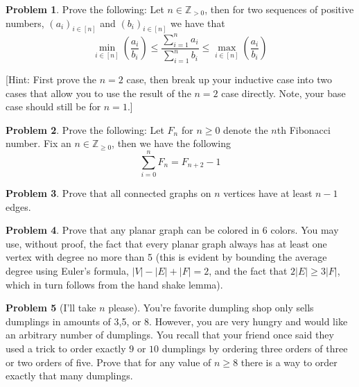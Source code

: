 \documentclass{article}
\theoremstyle{plain}
\theoremstyle{definition}
\newtheorem{problem}{Problem}[section]
\newcommand{\ZZ}{\mathbb{Z}_{\geq 0}}
\newcommand{\ZZZ}{\mathbb{Z}_{> 0}}
\begin{document}
\begin{problem}
    Prove the following:
    Let \(n \in \ZZZ\), then for two sequences of positive numbers, \((a_i)_{i \in [n]}\) and \((b_i)_{i \in [n]}\) we have that
    \[\min_{i \in [n]} \left(\frac{a_i}{b_i}\right) \leq \frac{\sum_{i = 1}^n a_i}{\sum_{i = 1}^n b_i} \leq \max_{i \in [n]} \left(\frac{a_i}{b_i}\right)\]

    [Hint: First prove the \(n=2\) case, then break up your inductive case into two cases that allow you to use the result of the \(n=2\) case directly. Note, your base case should still be for \(n=1\).]
\end{problem}

\begin{problem}
    Prove the following: Let \(F_n\) for \(n \geq 0\) denote the \(n\)th Fibonacci number. Fix an \(n \in \ZZ\), then we have the following
    \[\sum_{i = 0}^n F_n = F_{n+2} - 1\]
\end{problem}

\begin{problem}
    Prove that all connected graphs on \(n\) vertices have at least \(n-1\) edges.
\end{problem}

\begin{problem}
    Prove that any planar graph can be colored in 6 colors. You may use, without proof, the fact that every planar graph always has at least one vertex with degree no more than 5 (this is evident by bounding the average degree using Euler's formula, \(|V| - |E| + |F| = 2\), and the fact that \(2 |E| \geq 3 |F|\), which in turn follows from the hand shake lemma).
\end{problem}

\begin{problem}[I'll take \(n\) please]
    You're favorite dumpling shop only sells dumplings in amounts of 3,5, or 8. However, you are very hungry and would like an arbitrary number of dumplings. You recall that your friend once said they used a trick to order exactly \(9\) or \(10\) dumplings by ordering three orders of three or two orders of five. Prove that for any value of \(n \geq 8\) there is a way to order exactly that many dumplings.
\end{problem}
\end{document}
